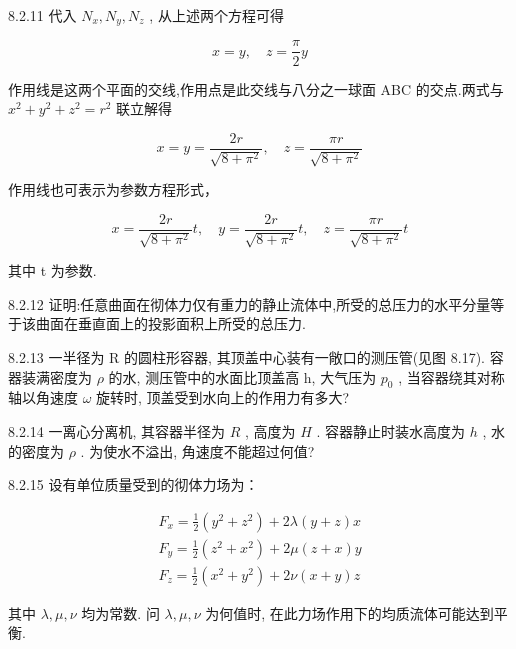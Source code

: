 \begin{problem}{8.2.11}
代入 $N_{x}, N_{y}, N_{z}$ , 从上述两个方程可得

\[
x = y, \quad z = \frac {\pi}{2} y
\]

作用线是这两个平面的交线,作用点是此交线与八分之一球面 ABC 的交点.两式与 $x^{2}+y^{2}+z^{2}=r^{2}$ 联立解得

\[
x = y = \frac {2 r}{\sqrt {8 + \pi^ {2}}}, \quad z = \frac {\pi r}{\sqrt {8 + \pi^ {2}}}
\]

作用线也可表示为参数方程形式，

\[
x = \frac {2 r}{\sqrt {8 + \pi^ {2}}} t, \quad y = \frac {2 r}{\sqrt {8 + \pi^ {2}}} t, \quad z = \frac {\pi r}{\sqrt {8 + \pi^ {2}}} t
\]

其中 t 为参数.
\begin{center}

\end{center}
\begin{center}

\end{center}
\end{problem}
\clearpage


\begin{problem}{8.2.12}
证明:任意曲面在彻体力仅有重力的静止流体中,所受的总压力的水平分量等于该曲面在垂直面上的投影面积上所受的总压力.
\end{problem}
\clearpage


\begin{problem}{8.2.13}
一半径为 R 的圆柱形容器, 其顶盖中心装有一敞口的测压管(见图 8.17). 容器装满密度为 $\rho$ 的水, 测压管中的水面比顶盖高 h, 大气压为 $p_{0}$ , 当容器绕其对称轴以角速度 $\omega$ 旋转时, 顶盖受到水向上的作用力有多大?
\begin{center}

\end{center}
\end{problem}
\clearpage


\begin{problem}{8.2.14}
一离心分离机, 其容器半径为 $R$ , 高度为 $H$ . 容器静止时装水高度为 $h$ , 水的密度为 $\rho$ . 为使水不溢出, 角速度不能超过何值?
\end{problem}
\clearpage


\begin{problem}{8.2.15}
设有单位质量受到的彻体力场为：

\[
\begin{array}{l} F _ {x} = \frac {1}{2} (y ^ {2} + z ^ {2}) + 2 \lambda (y + z) x \\ F _ {y} = \frac {1}{2} (z ^ {2} + x ^ {2}) + 2 \mu (z + x) y \\ F _ {z} = \frac {1}{2} (x ^ {2} + y ^ {2}) + 2 \nu (x + y) z \end{array}
\]

其中 $\lambda, \mu, \nu$ 均为常数. 问 $\lambda, \mu, \nu$ 为何值时, 在此力场作用下的均质流体可能达到平衡.
\end{problem}
\clearpage


